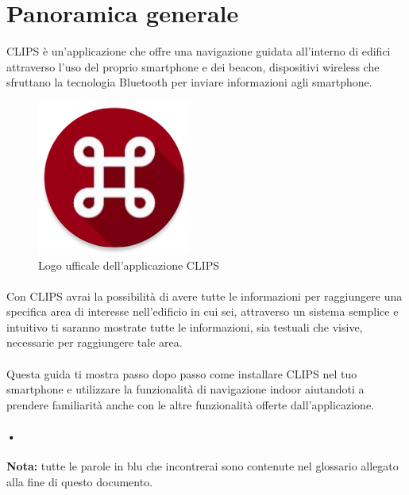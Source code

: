 \documentclass[../ClipsManualeUtente.tex]{subfiles}
\begin{document}
\section{Panoramica generale}

	CLIPS è un'applicazione che offre una navigazione guidata all'interno di edifici attraverso l'uso del proprio smartphone e dei \gls{beacon}, dispositivi wireless che sfruttano la tecnologia \gls{Bluetooth} per inviare informazioni agli smartphone.

	\begin{figure} [h]
		\centering
		\includegraphics[scale=0.5]{img/BigLogoApp}
		\caption{Logo ufficale dell'applicazione CLIPS}
		\label{fig:BigLogoApp}
	\end{figure}	
	
	\paragraph*{}
	Con CLIPS avrai la possibilità di avere tutte le informazioni per raggiungere una specifica area di interesse nell'edificio in cui sei, attraverso un sistema semplice e intuitivo ti saranno mostrate tutte le informazioni, sia testuali che visive, necessarie per raggiungere tale area.
	\paragraph*{}
	Questa guida ti mostra passo dopo passo come installare CLIPS nel tuo smartphone e utilizzare la funzionalità di \gls{navigazione indoor} aiutandoti a prendere familiarità anche con le altre funzionalità offerte dall'applicazione.
	\paragraph*{•}
	 \begin{framed}
	 \textbf{Nota:} tutte le parole in blu che incontrerai sono contenute nel glossario allegato alla fine di questo documento.
	 \end{framed}
	
\end{document}
